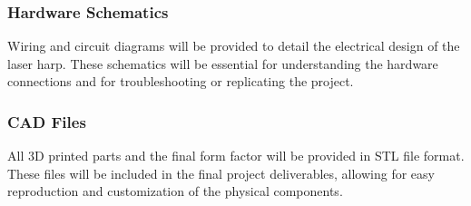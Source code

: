 \subsubsection{Hardware Schematics}
Wiring and circuit diagrams will be provided to detail the electrical design of the laser harp. These schematics will be essential for understanding the hardware connections and for troubleshooting or replicating the project.

\subsubsection{CAD Files}
All 3D printed parts and the final form factor will be provided in STL file format. These files will be included in the final project deliverables, allowing for easy reproduction and customization of the physical components.
